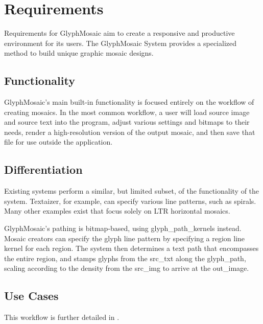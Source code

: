 \section{Requirements}
Requirements for GlyphMosaic aim to create a responsive and productive environment for its users.
The GlyphMosaic System provides a specialized method to build unique graphic mosaic designs.


\subsection{Functionality}
GlyphMosaic’s main built-in functionality is focused entirely on the workflow of creating mosaics.
In the most common workflow, a user will load source image and source text into the program, adjust various settings and bitmaps to their needs, render a high-resolution version of the output mosaic, and then save that file for use outside the application.


\subsection{Differentiation}
Existing systems perform a similar, but limited subset, of the functionality of the system.
Textaizer\cite{textaizer}, for example, can specify various line patterns, such as spirals.
Many other examples exist that focus solely on LTR horizontal mosaics.

GlyphMosaic's pathing is \gls{bitmap}-based, using \glspl{glyph_path_kernel} instead.
Mosaic creators can specify the glyph line pattern by specifying a region line kernel for each region.
The system then determines a text path that encompasses the entire region, and stamps glyphs from the \gls{src_txt} along the \gls{glyph_path}, scaling according to the \gls{density} from the \gls{src_img} to arrive at the \gls{out_image}.

\subsection{Use Cases}
\label{sec:use_cases}

\begin{itemize}
\end{itemize}

This workflow is further detailed in .